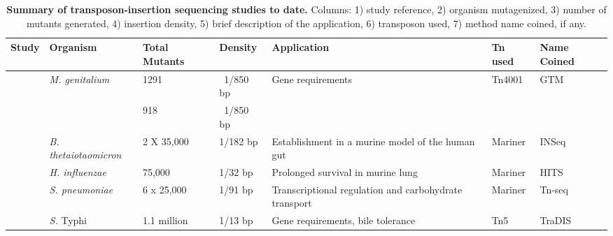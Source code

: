 %
\begingroup
\begin{landscape}
   \tiny
   \noindent
    \begin{longtable}{ l
    				l
				l
				l
				p{2in}
				l
				l}
    \caption[Summary of transposon-insertion sequencing studies to date]{\textbf{Summary of transposon-insertion sequencing studies to date.} Columns: 1) study reference,  2) organism mutagenized, 3) number of mutants generated, 4) insertion density, 5) brief description of the application, 6) transposon used, 7) method name coined, if any.}
    \\
    \toprule
    \textbf{Study} & \textbf{Organism} & \textbf{Total Mutants} & \textbf{Density} & \textbf{Application} & \textbf{Tn used } & \textbf{Name Coined} \\
    \midrule
    \multirow{2}[1]{*}{\textcite{Hutchison1999}}  & \multirow{2}[1]{*}{\textit{M. genitalium}} & 1291  &  ~1/850 bp & \multirow{2}[1]{2in}{Gene requirements} & \multirow{2}[1]{*}{Tn4001} & \multirow{2}[1]{*}{GTM\nomenclature[Z]{GTM}{Global transposon mutagenesis} } \\
          &  \textit{M. pneumoniae}     & 918   & ~1/850 bp &       &       &  \\
    \multirow{2}[0]{*}{\textcite{Goodman2009}} & \multirow{2}[0]{*}{\textit{B. thetaiotaomicron}} & \multirow{2}[0]{*}{2 X 35,000} & \multirow{2}[0]{*}{1/182 bp} & \multirow{2}[0]{2in}{Establishment in a murine model of the human gut} & \multirow{2}[0]{*}{Mariner} & \multirow{2}[0]{*}{INSeq} \\
          &       &       &       &       &       &  \\
    \multirow{2}[0]{*}{\textcite{Gawronski2009} } & \multirow{2}[0]{*}{\textit{H. influenzae}} & \multirow{2}[0]{*}{75,000} & \multirow{2}[0]{*}{1/32 bp} & \multirow{2}[0]{2in}{Prolonged survival in murine lung} & \multirow{2}[0]{*}{Mariner} & \multirow{2}[0]{*}{ HITS} \\
          &       &       &       &       &       &  \\
   \textcite{Opijnen2009}  & \textit{S. pneumoniae} & 6 x 25,000 & 1/91 bp & Transcriptional regulation and carbohydrate transport & Mariner & Tn-seq \\
    \multirow{2}[0]{*}{\textcite{Langridge2009a}}  & \multirow{2}[0]{*}{{\it S.} Typhi} & \multirow{2}[0]{*}{1.1 million} & 1/13 bp & \multirow{2}[0]{2in}{Gene requirements, bile tolerance} & \multirow{2}[0]{*}{Tn5} & \multirow{2}[0]{*}{TraDIS} \\

\end{longtable}
\end{landscape}

